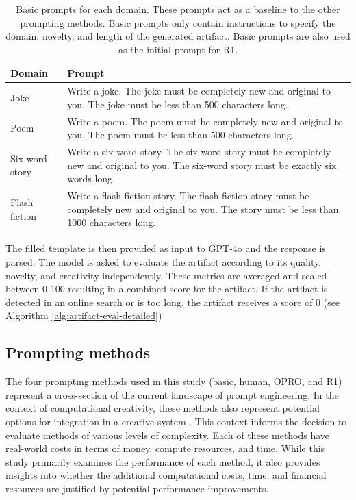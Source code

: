 \documentclass[phd,electronic,oneside,twosidetoc,letterpaper,chaptercenter,parttop,lof]{byumsphd}
\begin{document}
\begin{table}[t!]
\centering
\begin{tabular}{|p{}|p{}|}
\hline
\textbf{Domain} & \textbf{Prompt} \\
\hline
Joke & Write a joke. The joke must be completely new and original to you. The joke must be less than 500 characters long. \\
\hline
Poem & Write a poem. The poem must be completely new and original to you. The poem must be less than 500 characters long. \\
\hline
Six-word story & Write a six-word story. The six-word story must be completely new and original to you. The six-word story must be exactly six words long. \\
\hline
Flash fiction & Write a flash fiction story. The flash fiction story must be completely new and original to you. The story must be less than 1000 characters long. \\
\hline
\end{tabular}
\caption{Basic prompts for each domain. These prompts act as a baseline to the other prompting methods. Basic prompts only contain instructions to specify the domain, novelty, and length of the generated artifact. Basic prompts are also used as the initial prompt for R1.}
\label{tab:basic-prompts}\vspace{-.1in}
\end{table}


The filled template is then provided as input to GPT-4o and the response is parsed.
The model is asked to evaluate the artifact according to its quality, novelty, and creativity independently. These metrics are averaged and scaled between 0-100 resulting in a combined score for the artifact. If the artifact is detected in an online search or is too long, the artifact receives a score of 0 (see Algorithm \ref{alg:artifact-eval-detailed})

\subsection{Prompting methods}

The four prompting methods used in this study (basic, human, OPRO, and R1) represent a cross-section of the current landscape of prompt engineering. In the context of computational creativity, these methods also represent potential options for integration in a creative system \cite{veale2024symbolic}. This context informs the decision to evaluate methods of various levels of complexity. Each of these methods have real-world costs in terms of money, compute resources, and time. While this study primarily examines the performance of each method, it also provides insights into whether the additional computational costs, time, and financial resources are justified by potential performance improvements. 
\end{document}
